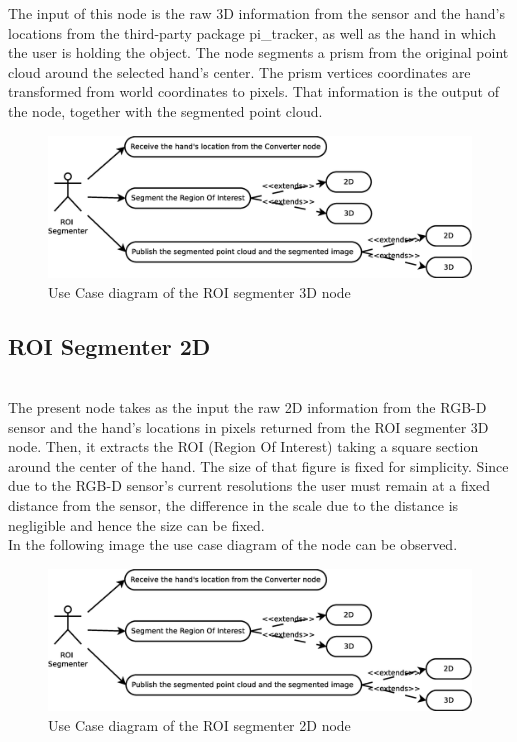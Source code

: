 	The input of this node is the raw 3D information from the sensor and the hand's locations from the third-party package pi\_tracker, as well as the hand in which the user is holding the object. The node segments a prism from the original point cloud around the selected hand's center. The prism vertices coordinates are transformed from world coordinates to pixels. That information is the output of the node, together with the segmented point cloud. 

	\begin{figure}[h]
		\begin{center}
	\includegraphics[scale=0.2]{img/diagrams/uc_roi_segmenter.eps}
		\caption[Use case diagram ROI segmenter 3D node]{Use Case diagram of the ROI segmenter 3D node}
		\end{center}
	\end{figure}
 
\subsection{ROI Segmenter 2D}\\
	\label{roi_segmenter_2d}
	The present node takes as the input the raw 2D information from the RGB-D sensor and the hand's locations in pixels returned from the ROI segmenter 3D node. Then, it extracts the ROI (Region Of Interest) taking a square section around the center of the hand. The size of that figure is fixed for simplicity. Since due to the RGB-D sensor's current resolutions the user must remain at a fixed distance from the sensor, the difference in the scale due to the distance is negligible and hence the size can be fixed. 
	\\

	In the following image the use case diagram of the node can be observed.
	\begin{figure}[h]
		\begin{center}
			\includegraphics[scale=0.2]{img/diagrams/uc_roi_segmenter.eps}
			\caption[Use case diagram ROI segmenter 2D node]{Use Case diagram of the ROI segmenter 2D node}
		\end{center}
	\end{figure}


